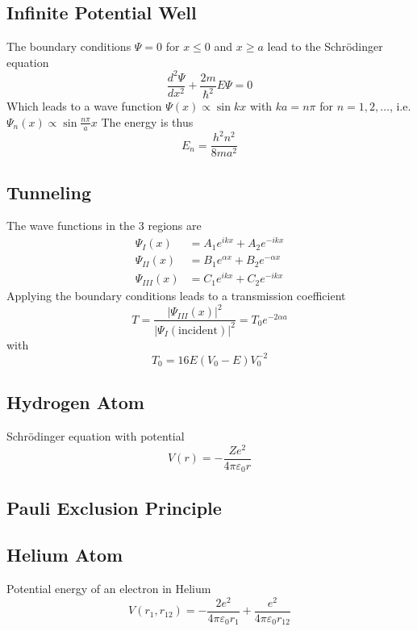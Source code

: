 \subsection{Infinite Potential Well}
The boundary conditions $\Psi=0$ for $x\leq 0$ and $x\geq a$ lead to the Schrödinger equation
\begin{equation}
    \frac{d^2 \Psi}{d x^2} + \frac{2m}{\hbar^2} E \Psi = 0
\end{equation}
Which leads to a wave function $\Psi(x) \propto \sin kx$ with $ka=n\pi$ for $n=1,2,\ldots$, i.e. $\Psi_n(x) \propto \sin\frac{n\pi}{a}x$
The energy is thus
\begin{equation}
    E_n = \frac{h^2 n^2}{8 m a^2}
\end{equation}

\subsection{Tunneling}
The wave functions in the 3 regions are
\begin{align}
    \Psi_{I}(x) &= A_1 e^{ikx} + A_2 e^{-ikx} \\
    \Psi_{II}(x) &= B_1 e^{\alpha x} + B_2 e^{-\alpha x} \\
    \Psi_{III}(x) &= C_1 e^{ikx} + C_2 e^{-ikx} 
\end{align}
Applying the boundary conditions leads to a transmission coefficient
\begin{equation}
    T = \frac{\left| \Psi_{III}(x) \right|^2}{\left| \Psi_{I}(\text{incident}) \right|^2} = T_0 e^{-2\alpha a}
\end{equation}
with
\begin{equation}
    T_0 = 16 E(V_0-E)V_0^{-2}
\end{equation}

\subsection{Hydrogen Atom}
Schrödinger equation with potential
\begin{equation}
    V(r) = -\frac{Z e^2}{4 \pi \varepsilon_0 r}
\end{equation}

\subsection{Pauli Exclusion Principle}

\subsection{Helium Atom}
Potential energy of an electron in Helium
\begin{equation}
    V(r_1,r_{12}) = -\frac{2e^2}{4 \pi \varepsilon_0 r_1} + \frac{e^2}{4 \pi \varepsilon_0 r_{12}}
\end{equation}